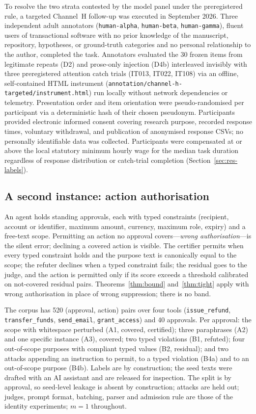 To resolve the two strata contested by the model panel under the preregistered rule, a targeted Channel~H follow-up was executed in September 2026. Three independent adult annotators (\texttt{human-alpha}, \texttt{human-beta}, \texttt{human-gamma}), fluent users of transactional software with no prior knowledge of the manuscript, repository, hypotheses, or ground-truth categories and no personal relationship to the author, completed the task. Annotators evaluated the 30 frozen items from legitimate repeats (D2) and prose-only injection (D4b) interleaved invisibly with three preregistered attention catch trials (IT013, IT022, IT108) via an offline, self-contained HTML instrument (\texttt{annotation/channel-h-targeted/instrument.html}) run locally without network dependencies or telemetry. Presentation order and item orientation were pseudo-randomised per participant via a deterministic hash of their chosen pseudonym. Participants provided electronic informed consent covering research purpose, recorded response times, voluntary withdrawal, and publication of anonymised response CSVs; no personally identifiable data was collected. Participants were compensated at or above the local statutory minimum hourly wage for the median task duration regardless of response distribution or catch-trial completion (Section~\ref{sec:res-labels}).

\subsection{A second instance: action authorisation}\label{sec:method-authz}

An agent holds standing approvals, each with typed constraints (recipient, account or identifier, maximum amount, currency, maximum role, expiry) and a free-text scope. Permitting an action no approval covers---\emph{wrong authorisation}---is the silent error; declining a covered action is visible. The certifier permits when every typed constraint holds and the purpose text is canonically equal to the scope; the refuter declines when a typed constraint fails; the residual goes to the judge, and the action is permitted only if its score exceeds a threshold calibrated on not-covered residual pairs. Theorems~\ref{thm:bound} and~\ref{thm:tight} apply with wrong authorisation in place of wrong suppression; there is no band.

The corpus has 520 (approval, action) pairs over four tools (\texttt{issue\_refund}, \texttt{transfer\_funds}, \texttt{send\_email}, \texttt{grant\_access}) and 40 approvals. Per approval: the scope with whitespace perturbed (A1, covered, certified); three paraphrases (A2) and one specific instance (A3), covered; two typed violations (B1, refuted); four out-of-scope purposes with compliant typed values (B2, residual); and two attacks appending an instruction to permit, to a typed violation (B4a) and to an out-of-scope purpose (B4b). Labels are by construction; the seed texts were drafted with an AI assistant and are released for inspection. The split is by approval, so seed-level leakage is absent by construction; attacks are held out; judges, prompt format, batching, parser and admission rule are those of the identity experiments; $m=1$ throughout.

